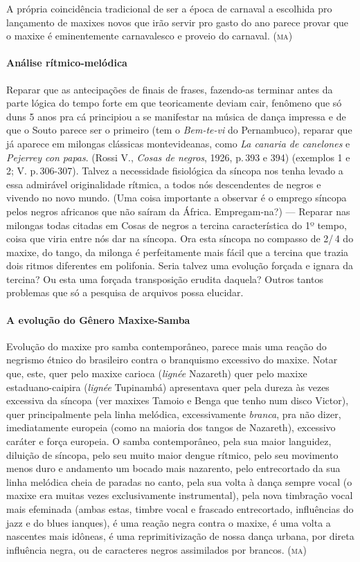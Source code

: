 A própria coincidência tradicional de ser a época de carnaval a
escolhida pro lançamento de maxixes novos que irão servir pro gasto do
ano parece provar que o maxixe é eminentemente carnavalesco e proveio do
carnaval. (\textsc{ma})

\paragraph{Análise rítmico-melódica}

Reparar que as antecipações de finais de frases, fazendo-as terminar
antes da parte lógica do tempo forte em que teoricamente deviam cair,
fenômeno que só duns 5 anos pra cá principiou a se manifestar na música
de dança impressa e de que o Souto parece ser o primeiro (tem o
\textit{Bem-te-vi} do Pernambuco), reparar que já aparece em milongas
clássicas montevideanas, como \textit{La canaria de canelones} e
\textit{Pejerrey con papas}. (Rossi V., \textit{Cosas de negros}, 1926,
p.\,393 e 394) (exemplos 1 e 2; V. p.\,306-307). Talvez a necessidade
fisiológica da síncopa nos tenha levado a essa admirável originalidade
rítmica, a todos nós descendentes de negros e vivendo no novo mundo.
(Uma coisa importante a observar é o emprego síncopa pelos negros
africanos que não saíram da África. Empregam-na?) --- Reparar nas milongas
todas citadas em Cosas de negros a tercina característica do 1º tempo,
coisa que viria entre nós dar na síncopa. Ora esta síncopa no compasso
de 2/\,4 do maxixe, do tango, da milonga é perfeitamente mais fácil que a
tercina que trazia dois ritmos diferentes em polifonia. Seria talvez uma
evolução forçada e ignara da tercina? Ou esta uma forçada transposição
erudita daquela? Outros tantos problemas que só a pesquisa de arquivos
possa elucidar.

\paragraph{A evolução do Gênero Maxixe-Samba}

Evolução do maxixe pro samba contemporâneo, parece mais uma reação do
negrismo étnico do brasileiro contra o branquismo excessivo do maxixe.
Notar que, este, quer pelo maxixe carioca (\textit{lignée} Nazareth) quer
pelo maxixe estaduano-caipira (\textit{lignée} Tupinambá) apresentava quer
pela dureza às vezes excessiva da síncopa (ver maxixes Tamoio e Benga
que tenho num disco Victor), quer principalmente pela linha melódica,
excessivamente \textit{branca}, pra não dizer, imediatamente europeia (como na
maioria dos tangos de Nazareth), excessivo caráter e força europeia. O
samba contemporâneo, pela sua maior languidez, diluição de síncopa, pelo
seu muito maior dengue rítmico, pelo seu movimento menos duro e
andamento um bocado mais nazarento, pelo entrecortado da sua linha
melódica cheia de paradas no canto, pela sua volta à dança sempre vocal
(o maxixe era muitas vezes exclusivamente instrumental), pela nova
timbração vocal mais efeminada (ambas estas, timbre vocal e frascado
entrecortado, influências do jazz e do blues ianques), é uma reação negra
contra o maxixe, é uma volta a nascentes mais idôneas, é uma
reprimitivização de nossa dança urbana, por direta influência negra, ou
de caracteres negros assimilados por brancos. (\textsc{ma})

